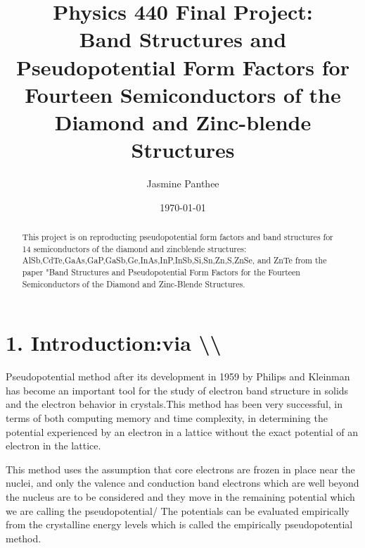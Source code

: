 \documentclass[%
 reprint,
 amsmath,amssymb,
 aps,
]{revtex4-2}
\begin{document}

\title{Physics 440 Final Project:\\Band Structures and Pseudopotential Form Factors for Fourteen Semiconductors of the Diamond and Zinc-blende Structures }%


\author{Jasmine Panthee}



\date{\today}%

\begin{abstract}
This project is on reproducting pseudopotential form factors and band structures for 14 semiconductors of the diamond and zincblende structures: AlSb,CdTe,GaAs,GaP,GaSb,Ge,InAs,InP,InSb,Si,Sn,Zn,S,ZnSe, and ZnTe from the paper "Band Structures and Pseudopotential Form Factors for the Fourteen Semiconductors of the Diamond and Zinc-Blende Structures. 
\end{abstract}

\maketitle


\section{\label{sec:level1}1. Introduction:\protect \lowercase{via} \textbackslash\textbackslash}

Pseudopotential method after its development in 1959 by Philips and Kleinman has become an important tool for the study of electron band structure in solids and the electron behavior in crystals.This method has been very successful, in terms of both computing memory and time complexity, in determining the potential experienced by an electron in a lattice without the exact potential of an electron in the lattice.   

This method uses the assumption that core electrons are frozen in place near the nuclei, and only the valence and conduction band electrons which are well beyond the nucleus are to be considered and they move in the remaining potential which we are calling the pseudopotential/ The potentials can be evaluated empirically from the crystalline energy levels which is called the empirically pseudopotential method.
\end{document}
